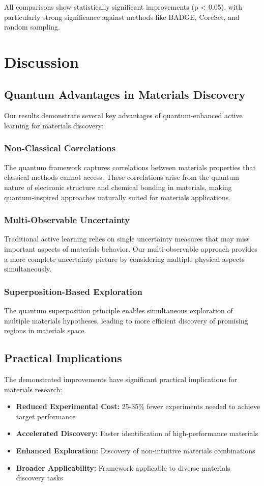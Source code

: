 \documentclass[twocolumn]{article}
\begin{document}
All comparisons show statistically significant improvements (p < 0.05), with particularly strong significance against methods like BADGE, CoreSet, and random sampling.

\section{Discussion}

\subsection{Quantum Advantages in Materials Discovery}

Our results demonstrate several key advantages of quantum-enhanced active learning for materials discovery:

\subsubsection{Non-Classical Correlations}
The quantum framework captures correlations between materials properties that classical methods cannot access. These correlations arise from the quantum nature of electronic structure and chemical bonding in materials, making quantum-inspired approaches naturally suited for materials applications.

\subsubsection{Multi-Observable Uncertainty}
Traditional active learning relies on single uncertainty measures that may miss important aspects of materials behavior. Our multi-observable approach provides a more complete uncertainty picture by considering multiple physical aspects simultaneously.

\subsubsection{Superposition-Based Exploration}
The quantum superposition principle enables simultaneous exploration of multiple materials hypotheses, leading to more efficient discovery of promising regions in materials space.

\subsection{Practical Implications}

The demonstrated improvements have significant practical implications for materials research:
\begin{itemize}
\item \textbf{Reduced Experimental Cost:} 25-35\% fewer experiments needed to achieve target performance
\item \textbf{Accelerated Discovery:} Faster identification of high-performance materials
\item \textbf{Enhanced Exploration:} Discovery of non-intuitive materials combinations
\item \textbf{Broader Applicability:} Framework applicable to diverse materials discovery tasks
\end{itemize}
\end{document}
